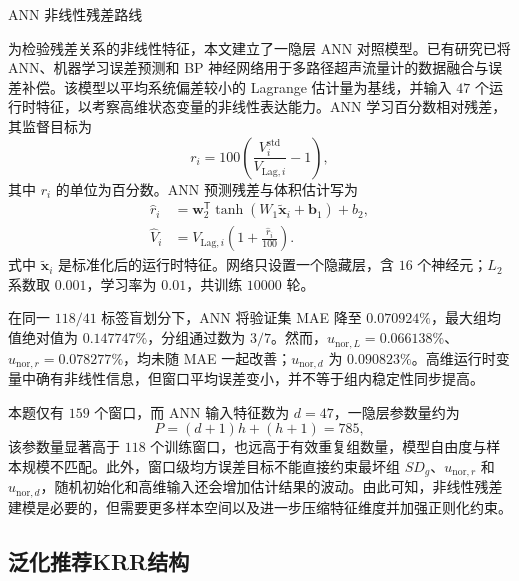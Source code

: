  ANN 非线性残差路线\par

为检验残差关系的非线性特征，本文建立了一隐层 ANN 对照模型。已有研究已将 ANN、机器学习误差预测和 BP 神经网络用于多路径超声流量计的数据融合与误差补偿\cite{Zhao2014ANN,Li2023MLInUse,HuangClampOnOil}。该模型以平均系统偏差较小的 Lagrange 估计量为基线，并输入 $47$ 个运行时特征，以考察高维状态变量的非线性表达能力。ANN 学习百分数相对残差，其监督目标为
\begin{equation}
r_i=100\left(\frac{V_i^{\mathrm{std}}}{V_{\mathrm{Lag},i}}-1\right),
\end{equation}
其中 $r_i$ 的单位为百分数。ANN 预测残差与体积估计写为
\begin{equation}
\begin{aligned}
\hat r_i
&=\boldsymbol{w}_2^{\mathsf T}
\tanh\left(W_1\tilde{\boldsymbol{x}}_i+\boldsymbol{b}_1\right)+b_2,\\
\hat V_i
&=V_{\mathrm{Lag},i}\left(1+\frac{\hat r_i}{100}\right).
\end{aligned}
\end{equation}
式中 $\tilde{\boldsymbol{x}}_i$ 是标准化后的运行时特征。网络只设置一个隐藏层，含 $16$ 个神经元；$L_2$ 系数取 $0.001$，学习率为 $0.01$，共训练 $10000$ 轮。

在同一 $118/41$ 标签盲划分下，ANN 将验证集 MAE 降至 $0.070924\%$，最大组均值绝对值为 $0.147747\%$，分组通过数为 $3/7$。然而，$u_{\mathrm{nor},L}=0.066138\%$、$u_{\mathrm{nor},r}=0.078277\%$，均未随 MAE 一起改善；$u_{\mathrm{nor},d}$ 为 $0.090823\%$。高维运行时变量中确有非线性信息，但窗口平均误差变小，并不等于组内稳定性同步提高。

本题仅有 $159$ 个窗口，而 ANN 输入特征数为 $d=47$，一隐层参数量约为
\begin{equation}
P=(d+1)h+(h+1)=785,
\end{equation}
该参数量显著高于 $118$ 个训练窗口，也远高于有效重复组数量，模型自由度与样本规模不匹配。此外，窗口级均方误差目标不能直接约束最坏组 $SD_g$、$u_{\mathrm{nor},r}$ 和 $u_{\mathrm{nor},d}$，随机初始化和高维输入还会增加估计结果的波动。由此可知，非线性残差建模是必要的，但需要更多样本空间以及进一步压缩特征维度并加强正则化约束。

\subsection{泛化推荐KRR结构}

